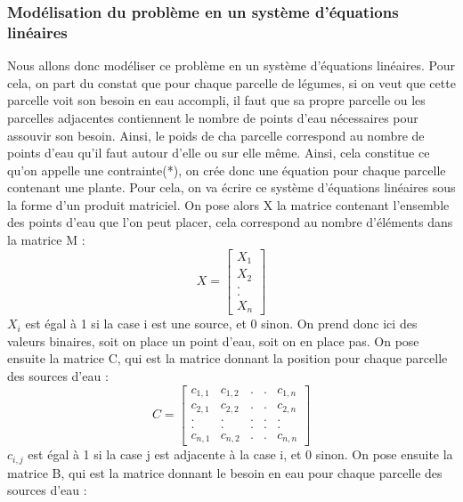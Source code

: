 \documentclass[french,a4paper]{article}
\begin{document}
\subsubsection{Modélisation du problème en un système d'équations linéaires}
Nous allons donc modéliser ce problème en un système d'équations linéaires.
\newline Pour cela, on part du constat que pour chaque parcelle de légumes, si on veut que cette parcelle voit son besoin en eau accompli, il faut que sa propre parcelle ou les parcelles adjacentes contiennent le nombre de points d'eau nécessaires pour assouvir son besoin. Ainsi, le poids de cha parcelle correspond au nombre de points d'eau qu'il faut autour d'elle ou sur elle même.
Ainsi, cela constitue ce qu'on appelle une contrainte(*), on crée donc une équation pour chaque parcelle contenant une plante. Pour cela, on va écrire ce système d'équations linéaires sous la forme d'un produit matriciel.
\newline On pose alors X la matrice contenant l'ensemble des points d'eau que l'on peut placer, cela correspond au nombre d'éléments dans la matrice M :
\newline \[X = \begin{bmatrix} X_1 \\ X_2 \\ . \\ . \\ X_n \end{bmatrix}\]
\newline $X_i$ est égal à 1 si la case i est une source, et 0 sinon. On prend donc ici des valeurs binaires, soit on place un point d'eau, soit on en place pas.
\newline On pose ensuite la matrice C, qui est la matrice donnant la position pour chaque parcelle des sources d'eau :
\newline \[C = \begin{bmatrix} c_{1,1} & c_{1,2} & . & . & c_{1,n} \\ c_{2,1} & c_{2,2} & . & . & c_{2,n} \\ . & . & . & . & . \\ . & . & . & . & . \\ c_{n,1} & c_{n,2} & . & . & c_{n,n} \end{bmatrix}\]
\newline $c_{i,j}$ est égal à 1 si la case j est adjacente à la case i, et 0 sinon.
\newline On pose ensuite la matrice B, qui est la matrice donnant le besoin en eau pour chaque parcelle des sources d'eau :
\end{document}
